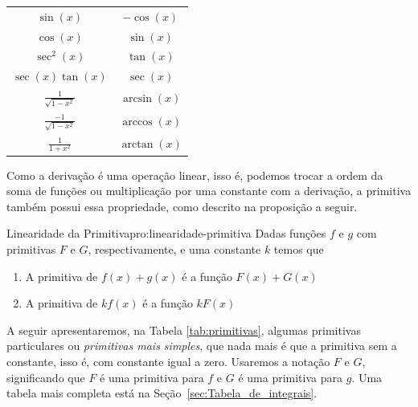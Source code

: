 \begin{table}[b]
\begin{tabular}{c<{\quad}>{\quad}c}
    \(\sin(x)\)                 & \(-\cos(x)\)            \\
    \(\cos(x)\)                 & \(\sin(x)\)             \\
    \(\sec^2(x)\)               & \(\tan(x)\)             \\
    \(\sec(x) \tan(x)\)         & \(\sec(x)\)             \\[1mm]
    \(\frac{1}{\sqrt{1-x^2}}\)  & \(\arcsin(x)\)          \\[2mm]
    \(\frac{-1}{\sqrt{1-x^2}}\) & \(\arccos(x)\)          \\[2mm]
    \(\frac{1}{1+x^2}\)         & \(\arctan(x)\)          \\[2mm]
    \hline
\end{tabular}
\end{table}

Como a derivação é uma operação linear, isso é, podemos trocar a ordem
da soma de funções ou multiplicação por uma constante com a derivação,
a primitiva também possui essa propriedade, como descrito na
proposição a seguir.

\begin{proposicao}{Linearidade da Primitiva}{pro:linearidade-primitiva}
  Dadas funções $f$ e $g$ com primitivas $F$ e $G$, respectivamente,
  e uma constante $k$ temos que
  \begin{enumerate}[parsep=11pt]
    \item A primitiva de \( f(x)+g(x)\) é a função \(F(x) + G(x)\)
    \item A primitiva de \( kf(x)\) é a função \(kF(x)\)
  \end{enumerate}
\end{proposicao}

A seguir apresentaremos, na Tabela \ref{tab:primitivas}, algumas primitivas
particulares ou \textit{primitivas mais simples}, que nada mais é que a
primitiva sem a constante, isso é, com constante igual a zero.
Usaremos a notação $F$ e $G$,
significando que $F$ é uma primitiva para $f$ e $G$ é uma primitiva para $g$.
Uma tabela mais completa está na Seção~\ref{sec:Tabela_de_integrais}.

